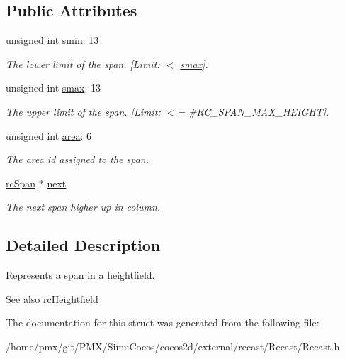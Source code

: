 \subsection*{Public Attributes}
\begin{DoxyCompactItemize}
\item 
\mbox{\label{structrcSpan_aba70c34dc95c49c4b3142b7d9ca9d359}} 
unsigned int \hyperlink{structrcSpan_aba70c34dc95c49c4b3142b7d9ca9d359}{smin}\+: 13
\begin{DoxyCompactList}\small\item\em The lower limit of the span. \mbox{[}Limit\+: $<$ \hyperlink{structrcSpan_a6bca504828087023719794cce9a5f0ab}{smax}\mbox{]}. \end{DoxyCompactList}\item 
\mbox{\label{structrcSpan_a6bca504828087023719794cce9a5f0ab}} 
unsigned int \hyperlink{structrcSpan_a6bca504828087023719794cce9a5f0ab}{smax}\+: 13
\begin{DoxyCompactList}\small\item\em The upper limit of the span. \mbox{[}Limit\+: $<$= \#\+R\+C\+\_\+\+S\+P\+A\+N\+\_\+\+M\+A\+X\+\_\+\+H\+E\+I\+G\+HT\mbox{]}. \end{DoxyCompactList}\item 
\mbox{\label{structrcSpan_a8bf133cf1e7ccf3d69f1ba365cb0c1ca}} 
unsigned int \hyperlink{structrcSpan_a8bf133cf1e7ccf3d69f1ba365cb0c1ca}{area}\+: 6
\begin{DoxyCompactList}\small\item\em The area id assigned to the span. \end{DoxyCompactList}\item 
\mbox{\label{structrcSpan_a9f62e93d86af3762160696e609f4b7db}} 
\hyperlink{structrcSpan}{rc\+Span} $\ast$ \hyperlink{structrcSpan_a9f62e93d86af3762160696e609f4b7db}{next}
\begin{DoxyCompactList}\small\item\em The next span higher up in column. \end{DoxyCompactList}\end{DoxyCompactItemize}


\subsection{Detailed Description}
Represents a span in a heightfield. \begin{DoxySeeAlso}{See also}
\hyperlink{structrcHeightfield}{rc\+Heightfield} 
\end{DoxySeeAlso}


The documentation for this struct was generated from the following file\+:\begin{DoxyCompactItemize}
\item 
/home/pmx/git/\+P\+M\+X/\+Simu\+Cocos/cocos2d/external/recast/\+Recast/Recast.\+h\end{DoxyCompactItemize}
